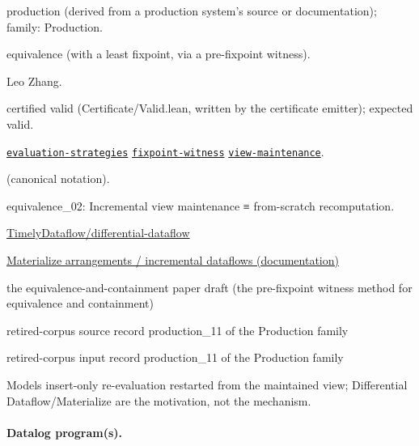 \documentclass[10pt]{article}
\begin{document}
\begin{description}[leftmargin=2.6cm,style=nextline,itemsep=1pt]

\item[Category] production (derived from a production system's source or documentation); family: Production.

\item[Kind] equivalence (with a least fixpoint, via a pre-fixpoint witness).

\item[Contributors] Leo Zhang.

\item[Status] certified valid (Certificate/Valid.lean, written by the certificate emitter); expected valid.

\item[Tags] \hyperref[tag:evaluation-strategies]{\texttt{evaluation-strategies}} \hyperref[tag:fixpoint-witness]{\texttt{fixpoint-witness}} \hyperref[tag:view-maintenance]{\texttt{view-maintenance}}.

\item[Input]  (canonical notation).

\item[Summary] equivalence\_02: Incremental view maintenance ≡ from-scratch recomputation.

\item[Sources] {\raggedright \href{https://github.com/TimelyDataflow/differential-dataflow}{TimelyDataflow/differential-dataflow} \par \href{https://materialize.com/docs/get-started/arrangements/}{Materialize arrangements / incremental dataflows (documentation)} \par the equivalence-and-containment paper draft (the pre-fixpoint witness method for equivalence and containment) \par retired-corpus source record production\_11 of the Production family \par retired-corpus input record production\_11 of the Production family\par}

\item[Note] Models insert-only re-evaluation restarted from the maintained view; Differential Dataflow/Materialize are the motivation, not the mechanism.

\end{description}

\paragraph{Datalog program(s).}
\end{document}

